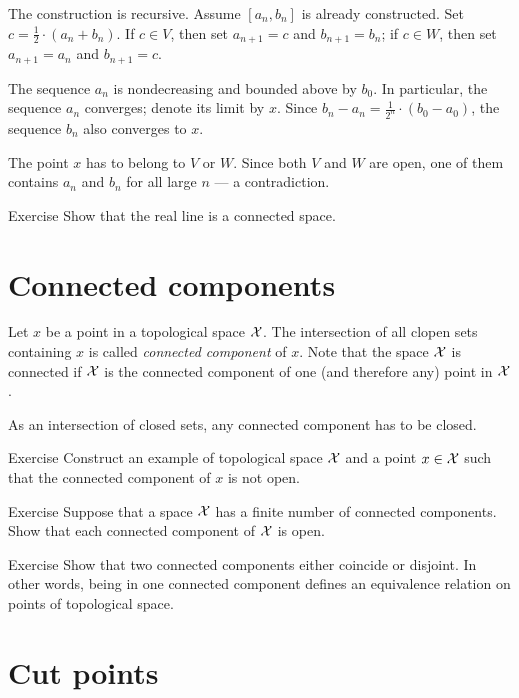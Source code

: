 The construction is recursive.
Assume $[a_n,b_n]$ is already constructed.
Set $c=\tfrac12\cdot(a_n+b_n)$.
If $c\in V$,
then set $a_{n+1}=c$ and $b_{n+1}=b_n$;
if $c\in W$, then set $a_{n+1}=a_n$ and $b_{n+1}=c$.

The sequence $a_n$ is nondecreasing and bounded above by $b_0$.
In particular, the sequence $a_n$ converges; denote its limit by $x$.
Since $b_n-a_n=\tfrac1{2^n}\cdot(b_0-a_0)$, the sequence $b_n$ also converges to $x$.

The point $x$ has to belong to $V$ or $W$.
Since both $V$ and $W$ are open, one of them contains $a_n$ and $b_n$ for all large $n$ --- a contradiction.
\qeds

\begin{thm}{Exercise}
Show that the real line is a connected space. 
\end{thm}

\section{Connected components}

Let $x$ be a point in a topological space $\mathcal{X}$.
The intersection of all clopen sets containing $x$ is called \emph{connected component} of $x$.
Note that the space $\mathcal{X}$ is connected if $\mathcal{X}$ is the connected component of one (and therefore any) point in $\mathcal{X}$.

As an intersection of closed sets,
any connected component has to be closed.

\begin{thm}{Exercise}
Construct an example of topological space $\mathcal{X}$ and a point $x\in \mathcal{X}$ such that the connected component of $x$ is not open.
\end{thm}

\begin{thm}{Exercise}
Suppose that a space $\mathcal{X}$ has a finite number of connected components.
Show that each connected component of $\mathcal{X}$ is open.
\end{thm}

\begin{thm}{Exercise}
Show that two connected components either coincide or disjoint.
In other words, being in one connected component defines an equivalence relation on points of topological space.
\end{thm}



\section{Cut points}

